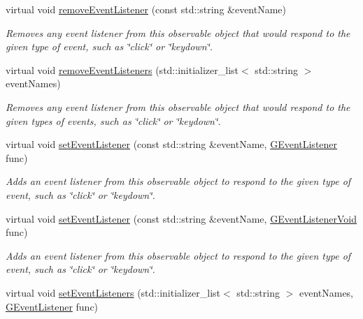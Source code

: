 \begin{DoxyCompactItemize}
virtual void \mbox{\hyperlink{classsgl_1_1GObservable_acbcf1ed3a851ad8a3c17ef38d86b481d}{remove\+Event\+Listener}} (const std\+::string \&event\+Name)
\begin{DoxyCompactList}\small\item\em Removes any event listener from this observable object that would respond to the given type of event, such as \char`\"{}click\char`\"{} or \char`\"{}keydown\char`\"{}. \end{DoxyCompactList}\item 
virtual void \mbox{\hyperlink{classsgl_1_1GObservable_af51cc35c29a1bd1908609d432decdbb6}{remove\+Event\+Listeners}} (std\+::initializer\+\_\+list$<$ std\+::string $>$ event\+Names)
\begin{DoxyCompactList}\small\item\em Removes any event listener from this observable object that would respond to the given types of events, such as \char`\"{}click\char`\"{} or \char`\"{}keydown\char`\"{}. \end{DoxyCompactList}\item 
virtual void \mbox{\hyperlink{classsgl_1_1GObservable_ad2f6d34961c50f6c1e0659990b79f741}{set\+Event\+Listener}} (const std\+::string \&event\+Name, \mbox{\hyperlink{namespacesgl_ae9f3e9eab70035da1a2b114e21357b25}{G\+Event\+Listener}} func)
\begin{DoxyCompactList}\small\item\em Adds an event listener from this observable object to respond to the given type of event, such as \char`\"{}click\char`\"{} or \char`\"{}keydown\char`\"{}. \end{DoxyCompactList}\item 
virtual void \mbox{\hyperlink{classsgl_1_1GObservable_abac4cb9f9e626e010e87f5d91573c8a5}{set\+Event\+Listener}} (const std\+::string \&event\+Name, \mbox{\hyperlink{namespacesgl_a54427ce97bb1c2804e4fe2b0a62e8b17}{G\+Event\+Listener\+Void}} func)
\begin{DoxyCompactList}\small\item\em Adds an event listener from this observable object to respond to the given type of event, such as \char`\"{}click\char`\"{} or \char`\"{}keydown\char`\"{}. \end{DoxyCompactList}\item 
virtual void \mbox{\hyperlink{classsgl_1_1GObservable_afa388d69c33c718cf035774604065604}{set\+Event\+Listeners}} (std\+::initializer\+\_\+list$<$ std\+::string $>$ event\+Names, \mbox{\hyperlink{namespacesgl_ae9f3e9eab70035da1a2b114e21357b25}{G\+Event\+Listener}} func)

\end{DoxyCompactItemize}

